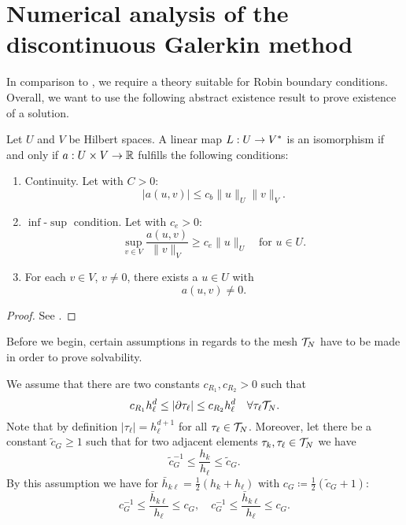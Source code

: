 \documentclass[../thesis.tex]{subfiles}
\begin{document}
\chapter{Numerical analysis of the discontinuous Galerkin method}
In comparison to \cite{Neumueller}, we require a theory suitable for Robin boundary conditions.
Overall, we want to use the following abstract existence result to prove existence of a solution.
\begin{theorem}
\label{thm:Necas-Babuska}
Let $U$ and $V$ be Hilbert spaces. A linear map $L : U \to V^*$ is an isomorphism if and only if $a : U \times V \to \mathbb{R}$ fulfills the following conditions:
\begin{enumerate}
\item Continuity. Let with $C > 0$:
\[
	| a(u, v) | \leq c_b \| u \|_U \| v \|_V.
\]
\item $\inf$-$\sup$ condition. Let with $c_e > 0$:
\[
	\sup_{v \in V} \frac{a(u, v)}{\| v \|_V} \geq c_e \| u \|_U \quad \text{for } u \in U.
\] 
\item For each $v \in V$, $v \neq 0$, there exists a $u \in U$ with
\[
	a(u, v) \neq 0.
\]
\end{enumerate}
\begin{proof}
See \cite[3.6 Satz]{Braess}.
\end{proof}
\end{theorem}
Before we begin, certain assumptions in regards to the mesh $\mathcal{T}_N$ have to be made in order to prove solvability.
\begin{assumption}
\label{as:mesh-assumptions}
We assume that there are two constants $c_{R_1}, c_{R_2} > 0$ such that
\[
	c_{R_1} h_\ell^d \leq |\partial \tau_\ell| \leq c_{R_2} h_\ell^d \quad \forall \tau_\ell \mathcal{T}_N.
\]
Note that by definition $|\tau_\ell| = h_\ell^{d+1}$ for all $\tau_\ell \in \mathcal{T}_N$.
Moreover, let there be a constant $\tilde{c}_G \geq 1$ such that for two adjacent elements $\tau_k, \tau_\ell \in \mathcal{T}_N$ we have
\[
	\tilde{c}_G^{-1} \leq \frac{h_k}{h_\ell} \leq \tilde{c}_G.
\]
By this assumption we have for $\bar{h}_{k\ell} = \frac{1}{2} (h_k + h_\ell)$ with $c_G \coloneqq \frac{1}{2} (\tilde{c}_G + 1)$:
\[
	c_G^{-1} \leq \frac{\bar{h}_{k\ell}}{h_\ell} \leq c_G, \quad c_G^{-1} \leq \frac{\bar{h}_{k\ell}}{h_\ell} \leq c_G.
\]
\end{assumption}
\end{document}
